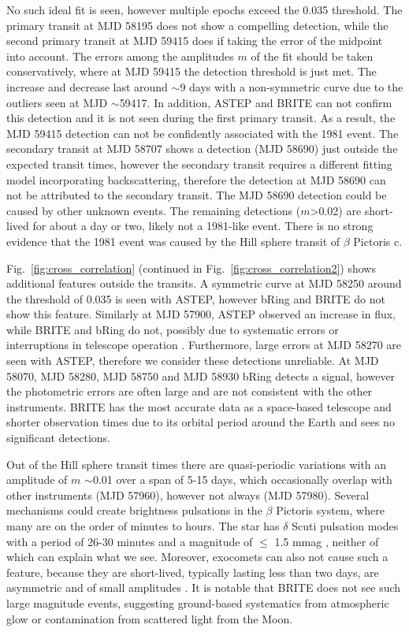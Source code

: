 \documentclass{aa}
\newcommand\picc{$\beta$ Pictoris c}
\newcommand\pic{$\beta$ Pictoris}
\begin{document}
No such ideal fit is seen, however multiple epochs exceed the 0.035 threshold.
%
The primary transit at MJD 58195 does not show a compelling detection, while the second primary transit at MJD 59415 does if taking the error of the midpoint into account. 
%
The errors among the amplitudes $m$ of the fit should be taken conservatively, where at MJD 59415 the detection threshold is just met.
%
The increase and decrease last around $\sim$9 days with a non-symmetric curve due to the outliers seen at MJD $\sim$59417. 
%
In addition, ASTEP and BRITE can not confirm this detection and it is not seen during the first primary transit. 
%
As a result, the MJD 59415 detection can not be confidently associated with the 1981 event.
%
The secondary transit at MJD 58707 shows a detection (MJD 58690) just outside the expected transit times, however the secondary transit requires a different fitting model incorporating backscattering, therefore the detection at MJD 58690 can not be attributed to the secondary transit. 
%
The MJD 58690 detection could be caused by other unknown events.
%
The remaining detections ($m$>0.02) are short-lived for about a day or two, likely not a 1981-like event.
%
There is no strong evidence that the 1981 event was caused by the Hill sphere transit of \picc{}.  

Fig.~\ref{fig:cross_correlation} (continued in Fig.~\ref{fig:cross_correlation2}) shows additional features outside the transits. 
%
A symmetric curve at MJD 58250 around the threshold of 0.035 is seen with ASTEP, however bRing and BRITE do not show this feature. 
%
Similarly at MJD 57900, ASTEP observed an increase in flux, while BRITE and bRing do not, possibly due to systematic errors or interruptions in telescope operation \citep{Kenworthy_2021}.
%
Furthermore, large errors at MJD 58270 are seen with ASTEP, therefore we consider these detections unreliable. 
%
At MJD 58070, MJD 58280, MJD 58750 and MJD 58930 bRing detects a signal, however the photometric errors are often large and are not consistent with the other instruments. 
%
BRITE has the most accurate data as a space-based telescope and shorter observation times due to its orbital period around the Earth and sees no significant detections.
%

Out of the Hill sphere transit times there are quasi-periodic variations with an amplitude of $m$ $\sim$0.01 over a span of 5-15 days, which occasionally overlap with other instruments (MJD 57960), however not always (MJD 57980).
%
Several mechanisms could create brightness pulsations in the \pic{} system, where many are on the order of minutes to hours.
%
The star has $\delta$ Scuti pulsation modes with a period of 26-30 minutes and a magnitude of $\leq$ 1.5 mmag \citep{Koen_2003}, neither of which can explain what we see.
%
Moreover, exocomets can also not cause such a feature, because they are short-lived, typically lasting less than two days, are asymmetric and of small amplitudes \citep[$<$2 mmag;][]{Heller_2024, Zieba_2019,  Pavlenko_2022, Lecavelier_2022}.  
%
It is notable that BRITE does not see such large magnitude events, suggesting ground-based systematics from atmospheric glow or contamination from scattered light from the Moon. 
\end{document}
